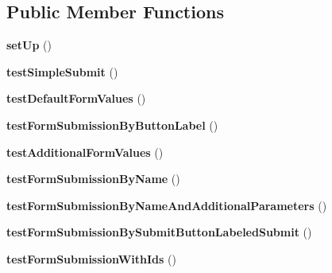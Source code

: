 \subsection*{Public Member Functions}
\begin{DoxyCompactItemize}
\item 
\hypertarget{class_live_test_of_forms_ad84821dbfd7cf0480cd40565128977f0}{
{\bfseries setUp} ()}
\label{class_live_test_of_forms_ad84821dbfd7cf0480cd40565128977f0}

\item 
\hypertarget{class_live_test_of_forms_a42a974d2f7e9fbf3182106cd8635f415}{
{\bfseries testSimpleSubmit} ()}
\label{class_live_test_of_forms_a42a974d2f7e9fbf3182106cd8635f415}

\item 
\hypertarget{class_live_test_of_forms_a7c16a765f18e17567f374f31960b2e15}{
{\bfseries testDefaultFormValues} ()}
\label{class_live_test_of_forms_a7c16a765f18e17567f374f31960b2e15}

\item 
\hypertarget{class_live_test_of_forms_aee44268fd29c7b6336ea8cf54ca3aa57}{
{\bfseries testFormSubmissionByButtonLabel} ()}
\label{class_live_test_of_forms_aee44268fd29c7b6336ea8cf54ca3aa57}

\item 
\hypertarget{class_live_test_of_forms_ac932a3fb45c59deb9c9a392628106de7}{
{\bfseries testAdditionalFormValues} ()}
\label{class_live_test_of_forms_ac932a3fb45c59deb9c9a392628106de7}

\item 
\hypertarget{class_live_test_of_forms_ad09db3be42ae541b657e847c360af470}{
{\bfseries testFormSubmissionByName} ()}
\label{class_live_test_of_forms_ad09db3be42ae541b657e847c360af470}

\item 
\hypertarget{class_live_test_of_forms_aa7e6e8878dd20ddd502fcd208559d6ee}{
{\bfseries testFormSubmissionByNameAndAdditionalParameters} ()}
\label{class_live_test_of_forms_aa7e6e8878dd20ddd502fcd208559d6ee}

\item 
\hypertarget{class_live_test_of_forms_ae727019ef5e1dfcd8b5c6df875570006}{
{\bfseries testFormSubmissionBySubmitButtonLabeledSubmit} ()}
\label{class_live_test_of_forms_ae727019ef5e1dfcd8b5c6df875570006}

\item 
\hypertarget{class_live_test_of_forms_ab74c4fd5d25ace796e6ea46a601814d4}{
{\bfseries testFormSubmissionWithIds} ()}
\label{class_live_test_of_forms_ab74c4fd5d25ace796e6ea46a601814d4}


\end{DoxyCompactItemize}
